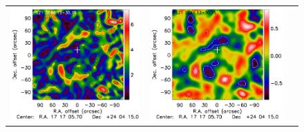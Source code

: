 \documentclass[traditabstract]{aa}
\begin{document}
\begin{figure}[p]
{\begin{tabular}{lll}
\includegraphics[trim=2.3cm 2.2cm 0cm 0cm, clip=true, scale=1]{Figure/Grad_PSZ1G046_15_15_45.pdf} & 
\includegraphics[trim=2.3cm 2.2cm 0cm 0cm, clip=true, scale=1]{Figure/DoG_PSZ1G046_15_15_45.pdf} \\

\end{tabular}}
\end{figure}
\end{document}
